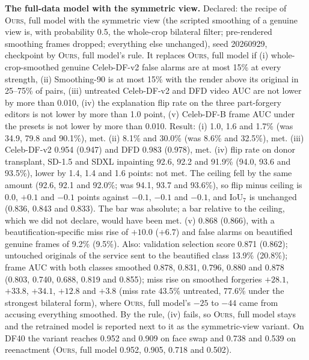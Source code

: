 \documentclass[10pt]{article}
\newcommand{\oursF}{\textsc{Ours}, full model}
\begin{document}
\textbf{The full-data model with the symmetric view.} Declared: the recipe of \oursF{} with the symmetric view (the scripted smoothing
of a genuine view is, with probability 0.5, the whole-crop bilateral filter; pre-rendered smoothing frames dropped; everything else
unchanged), seed 20260929, checkpoint by \oursF{}'s rule. It replaces \oursF{} if (i) whole-crop-smoothed genuine Celeb-DF-v2 false
alarms are at most 15\% at every strength, (ii) Smoothing-90 is at most 15\% with the render above its original in 25--75\% of
pairs, (iii) untreated Celeb-DF-v2 and DFD video AUC are not lower by more than 0.010, (iv) the explanation flip rate on the three
part-forgery editors is not lower by more than 1.0 point, (v) Celeb-DF-B frame AUC under the presets is not lower by more than 0.010.
Result: (i) 1.0, 1.6 and 1.7\% (was 34.9, 79.8 and 90.1\%), met. (ii) 8.1\% and 30.0\% (was 8.6\% and 32.5\%), met. (iii)
Celeb-DF-v2 0.954 (0.947) and DFD 0.983 (0.978), met. (iv) flip rate on donor transplant, SD-1.5 and SDXL inpainting 92.6, 92.2 and
91.9\% (94.0, 93.6 and 93.5\%), lower by 1.4, 1.4 and 1.6 points: not met. The ceiling fell by the same amount (92.6, 92.1 and
92.0\%; was 94.1, 93.7 and 93.6\%), so flip minus ceiling is 0.0, $+0.1$ and $-0.1$ points against $-0.1$, $-0.1$ and $-0.1$, and
IoU$_7$ is unchanged (0.836, 0.843 and 0.833). The bar was absolute; a bar relative to the ceiling, which we did not declare, would
have been met. (v) 0.868 (0.866), with a beautification-specific miss rise of $+10.0$ ($+6.7$) and false alarms on beautified genuine
frames of 9.2\% (9.5\%). Also: validation selection score 0.871 (0.862); untouched originals of the service sent to the beautified
class 13.9\% (20.8\%); frame AUC with both classes smoothed 0.878, 0.831, 0.796, 0.880 and 0.878 (0.803, 0.740, 0.688, 0.819 and
0.855); miss rise on smoothed forgeries $+28.1$, $+33.8$, $+34.1$, $+12.8$ and $+3.8$ (miss rate 43.5\% untreated, 77.6\% under the
strongest bilateral form), where \oursF{}'s $-25$ to $-44$ came from accusing everything smoothed. By the rule, (iv) fails, so \oursF{}
stays and the retrained model is reported next to it as the symmetric-view variant. On DF40 the variant reaches 0.952 and 0.909 on
face swap and 0.738 and 0.539 on reenactment (\oursF{} 0.952, 0.905, 0.718 and 0.502).
\end{document}
